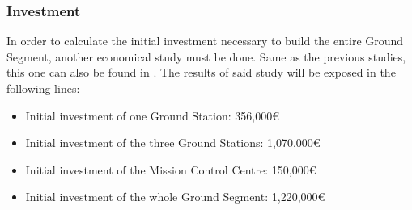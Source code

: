 \subsubsection{Investment}
In order to calculate the initial investment necessary to build the entire Ground Segment, another economical study must be done. Same as the previous studies, this one can also be found in \cite[Chapter 3, Section 3]{annex3}. The results of said study will be exposed in the following lines:

\begin{itemize}
\item Initial investment of one Ground Station: 356,000\euro
\item Initial investment of the three Ground Stations: 1,070,000\euro
\item Initial investment of the Mission Control Centre: 150,000\euro
\item Initial investment of the whole Ground Segment: 1,220,000\euro
\end{itemize}